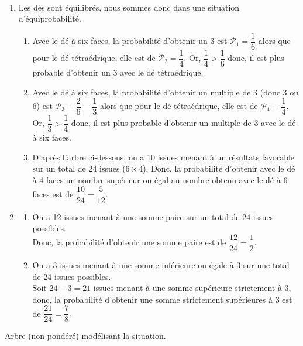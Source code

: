 \begin{corrige}
\ \\ [-5mm]
   \begin{enumerate}
      \item Les dés sont équilibrés, nous sommes donc dans une situation d'équiprobabilité. \\
         \begin{enumerate}
            \item Avec le dé à six faces, la probabilité d'obtenir un 3 est $\mathcal{P}_1 =\dfrac16$ alors que pour le dé tétraédrique, elle est de $\mathcal{P}_2=\dfrac14$. Or, $\dfrac14>\dfrac16$ donc, {\blue il est plus probable d'obtenir un 3 avec le dé tétraédrique}.
            \item Avec le dé à six faces, la probabilité d'obtenir un multiple de 3 (donc 3 ou 6) est $\mathcal{P}_3 =\dfrac26 =\dfrac13$ alors que pour le dé tétraédrique, elle est de $\mathcal{P}_4 =\dfrac14$. Or, $\dfrac13>\dfrac14$ donc, {\blue il est plus probable d'obtenir un multiple de 3 avec le dé à six faces}.
            \item D'après l'arbre ci-dessous, on a 10 issues menant à un résultats favorable sur un total de 24 issues ($6\times4$). Donc, {\blue la probabilité d'obtenir avec le dé à 4 faces un nombre supérieur ou égal au nombre obtenu avec le dé à 6 faces est de $\dfrac{10}{24} =\dfrac{5}{12}$}. \smallskip
         \end{enumerate}
      \setcounter{enumi}{1}
      \item
         \begin{enumerate}
            \item On a 12 issues menant à une somme paire sur un total de 24 issues possibles. \\
               Donc, {\blue la probabilité d'obtenir une somme paire est de $\dfrac{12}{24} =\dfrac12$}. \smallskip
            \item On a 3 issues menant à une somme inférieure ou égale à 3 sur une total de 24 issues possibles. \\
               Soit $24-3 =21$ issues menant à une somme supérieure strictement à 3, donc, {\blue la probabilité d'obtenir une somme strictement supérieures à 3 est de $\dfrac{21}{24} =\dfrac78$}. \bigskip
         \end{enumerate}
   \end{enumerate}
   Arbre (non pondéré) modélisant la situation. \\
   \bigskip
   \hspace*{2.5cm}

\end{corrige}
